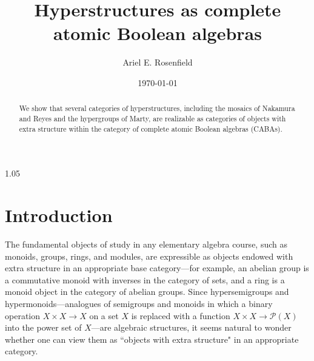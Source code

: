 \documentclass[reqno]{amsart}
\newcommand{\pow}{\mathcal{P}}
\numberwithin{equation}{section}
\theoremstyle{plain}
\theoremstyle{definition}
\begin{document}
\begin{spacing}{1.05}

\title{Hyperstructures as complete atomic Boolean algebras}

\author{Ariel E. Rosenfield}
\address{Department of Mathematics\\ University of Maryland---College Park \\
2100E IPST\\ College Park, MD 20742\\ USA}


\date{\today}

\begin{abstract} We show that several categories of hyperstructures, including the mosaics of Nakamura and Reyes and the hypergroups of Marty, are realizable as categories of objects with extra structure within the category of complete atomic Boolean algebras (CABAs). 
\end{abstract}

\maketitle

\setcounter{tocdepth}{1} %
\makeatletter
\def\l@subsection{\@tocline{2}{0pt}{2.5pc}{5pc}{}}
\def\l@subsubsection{\@tocline{2}{0pt}{5pc}{7.5pc}{}} %
\makeatother

\section{Introduction}

The fundamental objects of study in any elementary algebra course, such as monoids, groups, rings, and modules, are expressible as objects endowed with extra structure in an appropriate base category---for example, an abelian group is a commutative monoid with inverses in the category of sets, and a ring is a monoid object in the category of abelian groups. Since hypersemigroups and hypermonoids---analogues of semigroups and monoids in which a binary operation $X \times X \to X$ on a set $X$ is replaced with a function $X \times X \to \pow(X)$ into the power set of $X$---are algebraic structures, it seems natural to wonder whether one can view them as ``objects with extra structure" in an appropriate category.


\end{spacing}
\end{document}
